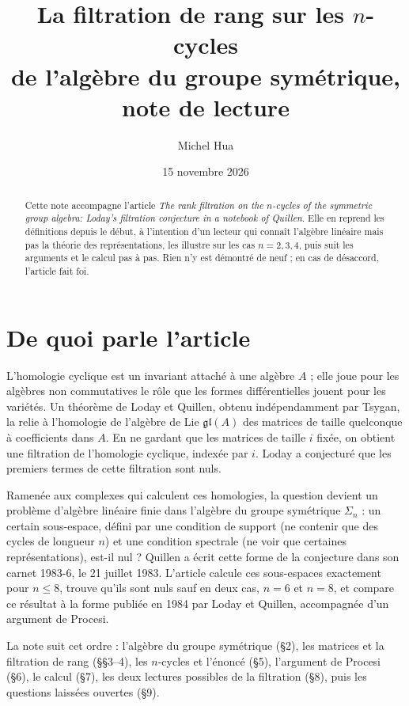 \documentclass[11pt,a4paper]{amsart}
\title[Note de lecture : la filtration de rang sur les $n$-cycles]{La filtration de rang sur les $n$-cycles\\ de l'algèbre du groupe symétrique,\\ note de lecture}
\author{Michel Hua}
\date{15 novembre 2026}
\theoremstyle{definition}
\theoremstyle{plain}
\theoremstyle{remark}
\newcommand{\gl}{\mathfrak{gl}}
\begin{document}
\maketitle

\begin{abstract}
Cette note accompagne l'article \emph{The rank filtration on the $n$-cycles of the symmetric group algebra: Loday's filtration conjecture in a notebook of Quillen}. Elle en reprend les définitions depuis le début, à l'intention d'un lecteur qui connaît l'algèbre linéaire mais pas la théorie des représentations, les illustre sur les cas $n = 2, 3, 4$, puis suit les arguments et le calcul pas à pas. Rien n'y est démontré de neuf ; en cas de désaccord, l'article fait foi.
\end{abstract}

\section{De quoi parle l'article}

L'homologie cyclique est un invariant attaché à une algèbre $A$ ; elle joue pour les algèbres non commutatives le rôle que les formes différentielles jouent pour les variétés. Un théorème de Loday et Quillen, obtenu indépendamment par Tsygan, la relie à l'homologie de l'algèbre de Lie $\gl(A)$ des matrices de taille quelconque à coefficients dans $A$. En ne gardant que les matrices de taille $i$ fixée, on obtient une filtration de l'homologie cyclique, indexée par $i$. Loday a conjecturé que les premiers termes de cette filtration sont nuls.

Ramenée aux complexes qui calculent ces homologies, la question devient un problème d'algèbre linéaire finie dans l'algèbre du groupe symétrique $\Sigma_n$ : un certain sous-espace, défini par une condition de support (ne contenir que des cycles de longueur $n$) et une condition spectrale (ne voir que certaines représentations), est-il nul ? Quillen a écrit cette forme de la conjecture dans son carnet 1983-6, le 21 juillet 1983. L'article calcule ces sous-espaces exactement pour $n \le 8$, trouve qu'ils sont nuls sauf en deux cas, $n = 6$ et $n = 8$, et compare ce résultat à la forme publiée en 1984 par Loday et Quillen, accompagnée d'un argument de Procesi.

La note suit cet ordre : l'algèbre du groupe symétrique (\S2), les matrices et la filtration de rang (\S\S3--4), les $n$-cycles et l'énoncé (\S5), l'argument de Procesi (\S6), le calcul (\S7), les deux lectures possibles de la filtration (\S8), puis les questions laissées ouvertes (\S9).
\end{document}

